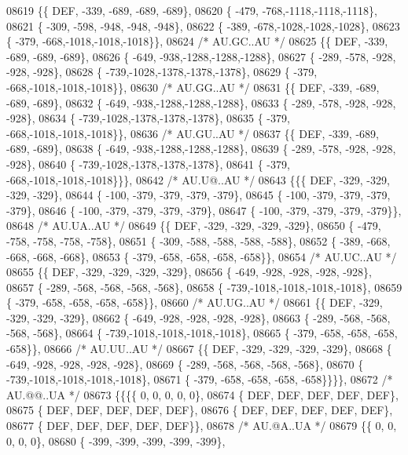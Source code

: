 \begin{DoxyCode}
08619 \{\{  DEF, -339, -689, -689, -689\},
08620 \{ -479, -768,-1118,-1118,-1118\},
08621 \{ -309, -598, -948, -948, -948\},
08622 \{ -389, -678,-1028,-1028,-1028\},
08623 \{ -379, -668,-1018,-1018,-1018\}\},
08624 \textcolor{comment}{/* AU.GC..AU */}
08625 \{\{  DEF, -339, -689, -689, -689\},
08626 \{ -649, -938,-1288,-1288,-1288\},
08627 \{ -289, -578, -928, -928, -928\},
08628 \{ -739,-1028,-1378,-1378,-1378\},
08629 \{ -379, -668,-1018,-1018,-1018\}\},
08630 \textcolor{comment}{/* AU.GG..AU */}
08631 \{\{  DEF, -339, -689, -689, -689\},
08632 \{ -649, -938,-1288,-1288,-1288\},
08633 \{ -289, -578, -928, -928, -928\},
08634 \{ -739,-1028,-1378,-1378,-1378\},
08635 \{ -379, -668,-1018,-1018,-1018\}\},
08636 \textcolor{comment}{/* AU.GU..AU */}
08637 \{\{  DEF, -339, -689, -689, -689\},
08638 \{ -649, -938,-1288,-1288,-1288\},
08639 \{ -289, -578, -928, -928, -928\},
08640 \{ -739,-1028,-1378,-1378,-1378\},
08641 \{ -379, -668,-1018,-1018,-1018\}\}\},
08642 \textcolor{comment}{/* AU.U@..AU */}
08643 \{\{\{  DEF, -329, -329, -329, -329\},
08644 \{ -100, -379, -379, -379, -379\},
08645 \{ -100, -379, -379, -379, -379\},
08646 \{ -100, -379, -379, -379, -379\},
08647 \{ -100, -379, -379, -379, -379\}\},
08648 \textcolor{comment}{/* AU.UA..AU */}
08649 \{\{  DEF, -329, -329, -329, -329\},
08650 \{ -479, -758, -758, -758, -758\},
08651 \{ -309, -588, -588, -588, -588\},
08652 \{ -389, -668, -668, -668, -668\},
08653 \{ -379, -658, -658, -658, -658\}\},
08654 \textcolor{comment}{/* AU.UC..AU */}
08655 \{\{  DEF, -329, -329, -329, -329\},
08656 \{ -649, -928, -928, -928, -928\},
08657 \{ -289, -568, -568, -568, -568\},
08658 \{ -739,-1018,-1018,-1018,-1018\},
08659 \{ -379, -658, -658, -658, -658\}\},
08660 \textcolor{comment}{/* AU.UG..AU */}
08661 \{\{  DEF, -329, -329, -329, -329\},
08662 \{ -649, -928, -928, -928, -928\},
08663 \{ -289, -568, -568, -568, -568\},
08664 \{ -739,-1018,-1018,-1018,-1018\},
08665 \{ -379, -658, -658, -658, -658\}\},
08666 \textcolor{comment}{/* AU.UU..AU */}
08667 \{\{  DEF, -329, -329, -329, -329\},
08668 \{ -649, -928, -928, -928, -928\},
08669 \{ -289, -568, -568, -568, -568\},
08670 \{ -739,-1018,-1018,-1018,-1018\},
08671 \{ -379, -658, -658, -658, -658\}\}\}\},
08672 \textcolor{comment}{/* AU.@@..UA */}
08673 \{\{\{\{    0,    0,    0,    0,    0\},
08674 \{  DEF,  DEF,  DEF,  DEF,  DEF\},
08675 \{  DEF,  DEF,  DEF,  DEF,  DEF\},
08676 \{  DEF,  DEF,  DEF,  DEF,  DEF\},
08677 \{  DEF,  DEF,  DEF,  DEF,  DEF\}\},
08678 \textcolor{comment}{/* AU.@A..UA */}
08679 \{\{    0,    0,    0,    0,    0\},
08680 \{ -399, -399, -399, -399, -399\},

\end{DoxyCode}
